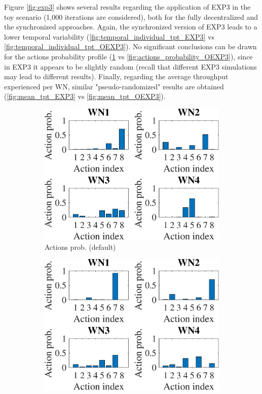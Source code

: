 \documentclass[preprint,12pt]{article}
\begin{document}
Figure \ref{fig:exp3} shows several results regarding the application of EXP3 in the toy scenario (1,000 iterations are considered), both for the fully decentralized and the synchronized approaches. Again, the synchronized version of EXP3 leads to a lower temporal variability (\ref{fig:temporal_individual_tpt_EXP3} vs \ref{fig:temporal_individual_tpt_OEXP3}). No significant conclusions can be drawn for the actions probability profile (\ref{fig:actions_probability_EXP3} vs \ref{fig:actions_probability_OEXP3}), since in EXP3 it appears to be slightly random (recall that different EXP3 simulations may lead to different results). Finally, regarding the average throughput experienced per WN, similar "pseudo-randomized" results are obtained (\ref{fig:mean_tpt_EXP3} vs \ref{fig:mean_tpt_OEXP3}). 

\begin{figure}[h!]
	\centering
	\begin{subfigure}[b]{.33\textwidth}
		\includegraphics[width=\textwidth]{images/actions_probability_EXP3}
		\caption{Actions prob. (default)}\label{fig:actions_probability_EXP3}
	\end{subfigure}
	\begin{subfigure}[b]{.33\textwidth}
		\includegraphics[width=\textwidth]{images/actions_probability_OEXP3}

\end{subfigure}
\end{figure}
\end{document}
